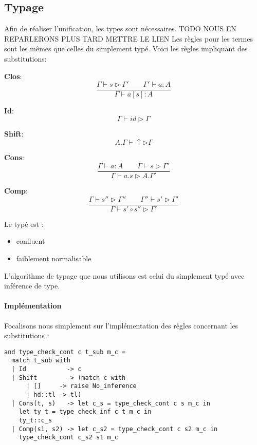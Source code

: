 \subsection{Typage}


Afin de réaliser l'unification, les types sont nécessaires.
TODO NOUS EN REPARLERONS PLUS TARD METTRE LE LIEN
Les règles pour les termes sont les mêmes que celles du \lc{} simplement typé. Voici les règles impliquant des substitutions:
 
\textbf{Clos}:
\[ \frac{\Gamma \vdash s \rhd \Gamma' \quad \quad \Gamma' \vdash a:A}{\Gamma \vdash a[s]:A} \]

\textbf{Id}:
\[ \Gamma \vdash id \rhd \Gamma \]

\textbf{Shift}:
\[ A.\Gamma \vdash \uparrow \rhd \Gamma \]

\textbf{Cons}:
\[ \frac{\Gamma \vdash a:A \quad \quad \Gamma \vdash s \rhd \Gamma'}{\Gamma \vdash a.s \rhd A.\Gamma'}\]

\textbf{Comp}:
\[ \frac{\Gamma \vdash s'' \rhd \Gamma'' \quad \quad \Gamma'' \vdash s'\rhd \Gamma'}{\Gamma \vdash s' \circ s'' \rhd \Gamma'} \]
 
\begin{prop}
Le \lsc{} typé est :
\begin{itemize}
    \item confluent
    \item faiblement normalisable
\end{itemize}
\end{prop}
 
L'algorithme de typage que nous utilisons est celui du \lc{} simplement typé avec inférence de type.


\paragraph{Implémentation}

Focalisons nous simplement sur l'implémentation des règles concernant les substitutions :

\begin{lstlisting}
and type_check_cont c t_sub m_c =
  match t_sub with
  | Id           -> c
  | Shift        -> (match c with
      | []     -> raise No_inference
      | hd::tl -> tl)
  | Cons(t, s)   -> let c_s = type_check_cont c s m_c in
    let ty_t = type_check_inf c t m_c in
    ty_t::c_s
  | Comp(s1, s2) -> let c_s2 = type_check_cont c s2 m_c in
    type_check_cont c_s2 s1 m_c 
\end{lstlisting}




